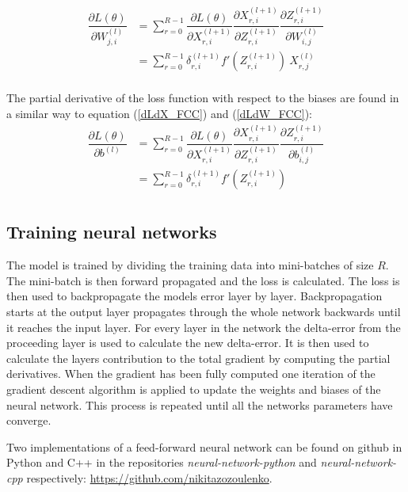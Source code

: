 \documentclass[a4paper, twoside]{article}
\newcommand*{\pd}[2]{\ensuremath{\dfrac{\partial #1}{\partial #2}}}
\begin{document}
\begin{equation}\label{dLdW_FCC}
\begin{split}
\pd{L(\theta)}{W^{(l)}_{j,i}} 
	& = \sum^{R-1}_{r=0} \pd{L(\theta)}{X^{(l+1)}_{r,i}} \pd{X^{(l+1)}_{r,i}}{Z^{(l+1)}_{r,i}} \pd{Z^{(l+1)}_{r,i}}{W^{(l)}_{i,j}} \\
	& = \sum^{R-1}_{r=0} \delta^{(l+1)}_{r,i} f'(Z^{(l+1)}_{r,i}) \ X^{(l)}_{r,j}\\
\end{split}
\end{equation}

The partial derivative of the loss function with respect to the biases are found in a similar way to equation (\ref{dLdX_FCC}) and (\ref{dLdW_FCC}): \cite{cs231n} \cite{wikiStanford}
\begin{equation}\label{dLdb_FCC}
\begin{split}
\pd{L(\theta)}{b^{(l)}} 
	& = \sum^{R-1}_{r=0} \pd{L(\theta)}{X^{(l+1)}_{r,i}} \pd{X^{(l+1)}_{r,i}}{Z^{(l+1)}_{r,i}} \pd{Z^{(l+1)}_{r,i}}{b^{(l)}_{i,j}} \\
	& = \sum^{R-1}_{r=0} \delta^{(l+1)}_{r,i} f'(Z^{(l+1)}_{r,i}) \\
\end{split}
\end{equation}


\subsection{Training neural networks}
The model is trained by dividing the training data into mini-batches of size $R$. The mini-batch is then forward propagated and the loss is calculated. The loss is then used to backpropagate the models error layer by layer. Backpropagation starts at the output layer propagates through the whole network backwards until it reaches the input layer. For every layer in the network the delta-error from the proceeding layer is used to calculate the new delta-error. It is then used to calculate the layers contribution to the total gradient by computing the partial derivatives. When the gradient has been fully computed one iteration of the gradient descent algorithm is applied to update the weights and biases of the neural network. This process is repeated until all the networks parameters have converge.\cite{cs231n}

Two implementations of a feed-forward neural network can be found on github in Python and C++ in the repositories \textit{neural-network-python} and \textit{neural-network-cpp} respectively: \url{https://github.com/nikitazozoulenko}.
\end{document}
